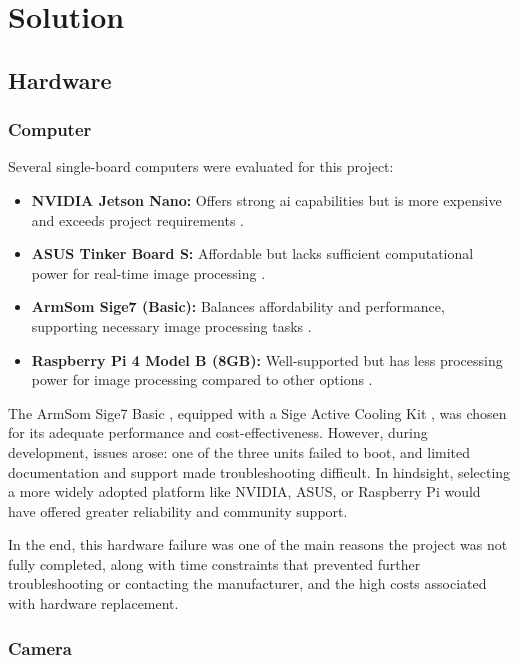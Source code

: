 \chapter{Solution}

\section{Hardware}

\subsection{Computer}

Several single-board computers were evaluated for this project:

\begin{itemize}
	\item \textbf{NVIDIA Jetson Nano:} Offers strong \acrshort{ai} capabilities but is more expensive and exceeds project requirements \cite{nvidia_jetson_nano}.
	\item \textbf{ASUS Tinker Board S:} Affordable but lacks sufficient computational power for real-time image processing \cite{asus_tinkerboard_s}.
	\item \textbf{ArmSom Sige7 (Basic):} Balances affordability and performance, supporting necessary image processing tasks \cite{armsom_sige7}.
	\item \textbf{Raspberry Pi 4 Model B (8GB):} Well-supported but has less processing power for image processing compared to other options \cite{raspberry_pi_4b}.
\end{itemize}

The ArmSom Sige7 Basic \cite{armsom_sige7}, equipped with a Sige Active Cooling Kit \cite{armsom_sige_cooling_kit}, was chosen for its adequate performance and cost-effectiveness. However, during development, issues arose: one of the three units failed to boot, and limited documentation and support made troubleshooting difficult. In hindsight, selecting a more widely adopted platform like NVIDIA, ASUS, or Raspberry Pi would have offered greater reliability and community support.

In the end, this hardware failure was one of the main reasons the project was not fully completed, along with time constraints that prevented further troubleshooting or contacting the manufacturer, and the high costs associated with hardware replacement.

\subsection{Camera}

